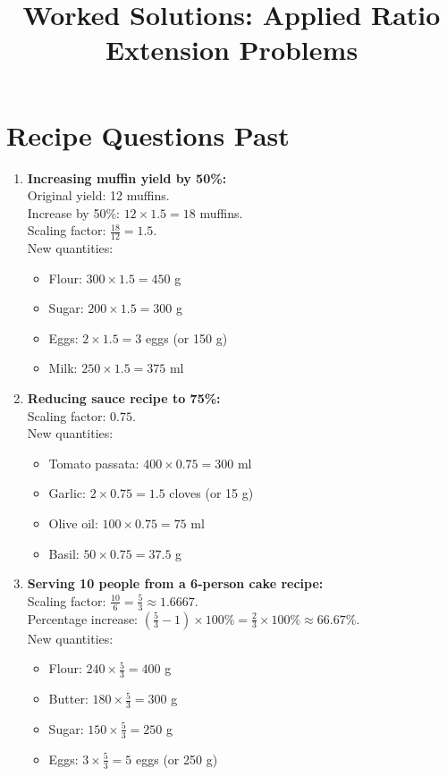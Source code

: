 \documentclass[12pt]{article}
\title{Worked Solutions: Applied Ratio Extension Problems}
\date{}
\begin{document}
\maketitle

\section*{Recipe Questions Past}

\begin{enumerate}
    \item \textbf{Increasing muffin yield by 50\%:} \\
    Original yield: 12 muffins. \\
    Increase by 50\%: \( 12 \times 1.5 = 18 \) muffins. \\
    Scaling factor: \( \frac{18}{12} = 1.5 \). \\
    New quantities:
    \begin{itemize}
        \item Flour: \( 300 \times 1.5 = 450\) g
        \item Sugar: \( 200 \times 1.5 = 300\) g
        \item Eggs: \( 2 \times 1.5 = 3\) eggs (or 150 g)
        \item Milk: \( 250 \times 1.5 = 375\) ml
    \end{itemize}

    \item \textbf{Reducing sauce recipe to 75\%:} \\
    Scaling factor: \( 0.75 \). \\
    New quantities:
    \begin{itemize}
        \item Tomato passata: \( 400 \times 0.75 = 300\) ml
        \item Garlic: \( 2 \times 0.75 = 1.5\) cloves (or 15 g)
        \item Olive oil: \( 100 \times 0.75 = 75\) ml
        \item Basil: \( 50 \times 0.75 = 37.5\) g
    \end{itemize}

    \item \textbf{Serving 10 people from a 6-person cake recipe:} \\
    Scaling factor: \( \frac{10}{6} = \frac{5}{3} \approx 1.6667\). \\
    Percentage increase: \( \left( \frac{5}{3} - 1 \right) \times 100\% = \frac{2}{3} \times 100\% \approx 66.67\% \). \\
    New quantities:
    \begin{itemize}
        \item Flour: \( 240 \times \frac{5}{3} = 400\) g
        \item Butter: \( 180 \times \frac{5}{3} = 300\) g
        \item Sugar: \( 150 \times \frac{5}{3} = 250\) g
        \item Eggs: \( 3 \times \frac{5}{3} = 5\) eggs (or 250 g)
    \end{itemize}


\end{enumerate}
\end{document}
